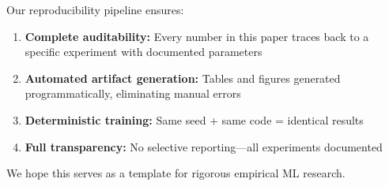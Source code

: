 Our reproducibility pipeline ensures:
\begin{enumerate}
    \item \textbf{Complete auditability:} Every number in this paper traces back to a specific experiment with documented parameters
    \item \textbf{Automated artifact generation:} Tables and figures generated programmatically, eliminating manual errors
    \item \textbf{Deterministic training:} Same seed + same code = identical results
    \item \textbf{Full transparency:} No selective reporting—all experiments documented
\end{enumerate}

We hope this serves as a template for rigorous empirical ML research.
